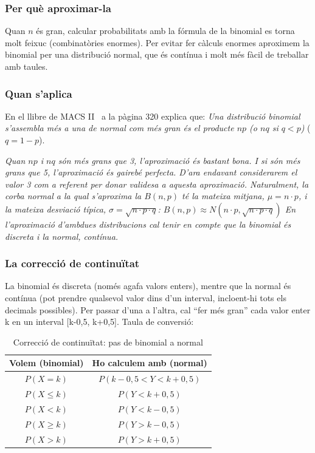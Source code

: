 \subsubsection{Per què aproximar-la}
Quan $n$ és gran, calcular probabilitats amb la fórmula de la binomial es torna molt feixuc (combinatòries enormes). Per evitar fer càlculs enormes aproximem la binomial per una distribució normal, que és contínua i molt més fàcil de treballar amb taules.


\subsubsection{Quan s'aplica}
En el llibre de MACS II~\cite{Llibre_MACS_II} a la pàgina 320 explica que:
\emph{Una distribució binomial s'assembla més a una de normal com més gran és el producte $np$ (o $nq$ si $q<p$)} ($q=1-p$).

\emph{Quan $np$ i $nq$ són més grans que 3, l'aproximació és bastant bona. I si són més grans que 5, l'aproximació és gairebé perfecta. D'ara endavant considerarem el valor 3 com a referent per donar validesa a aquesta aproximació.
Naturalment, la corba normal a la qual s'aproxima la $B(n, p)$ té la mateixa mitjana, $\mu = n \cdot p$, i la mateixa desviació típica, $\sigma = \sqrt{n \cdot p \cdot q}$:
$B(n, p) \approx N(n \cdot p, \sqrt{n \cdot p \cdot q})$
En l'aproximació d'ambdues distribucions cal tenir en compte que la binomial és discreta i la normal, contínua.}

\subsubsection{La correcció de continuïtat}
La binomial és discreta (només agafa valors enters), mentre que la normal és contínua (pot prendre qualsevol valor dins d'un interval, incloent-hi tots els decimals possibles). Per passar d'una a l'altra, cal ``fer més gran'' cada valor enter k en un interval [k-0,5, k+0,5].
Taula de conversió:
\begin{table}[h!]
    \centering
    \begin{tabular}{c|c}
        \hline
        Volem (binomial) & Ho calculem amb (normal) \\
        \hline
        $P(X=k)$ & $P(k-0,5<Y<k+0,5)$ \\
        $P(X\leq k)$ & $P(Y<k+0,5)$ \\
        $P(X<k)$ & $P(Y<k-0,5)$ \\
        $P(X\geq k)$ & $P(Y>k-0,5)$ \\
        $P(X>k)$ & $P(Y>k+0,5)$ \\
        \hline
    \end{tabular}
    \caption{Correcció de continuïtat: pas de binomial a normal}
    \label{tau-correccio-continuitat}
\end{table}

